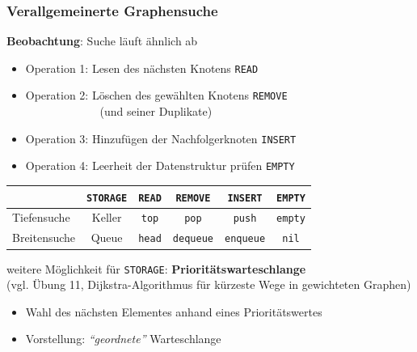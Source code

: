 \documentclass{beamer}
\begin{document}
\begin{frame} \frametitle{Verallgemeinerte Graphensuche}
	\small
	\textbf{Beobachtung}: Suche läuft ähnlich ab
	\begin{itemize}
		\item Operation 1: Lesen des nächsten Knotens \hfill \texttt{READ}
		\item Operation 2: Löschen des gewählten Knotens \hfill \texttt{REMOVE} \\ $\phantom{Operation 2: \enskip}$ \textcolor{cdgray!50}{(und seiner Duplikate)} 
		\item Operation 3: Hinzufügen der Nachfolgerknoten \hfill \texttt{INSERT}
		\item Operation 4: Leerheit der Datenstruktur prüfen \hfill \texttt{EMPTY}
	\end{itemize}

	\pause
	\begin{center}
		\begin{tabular}{l|ccccc}
			& \texttt{STORAGE} & \texttt{READ} & \texttt{REMOVE} & \texttt{INSERT} & \texttt{EMPTY} \\ \hline
			Tiefensuche & Keller & \texttt{top} & \texttt{pop} & \texttt{push} & \texttt{empty} \\
			Breitensuche & Queue & \texttt{head} & \texttt{dequeue} & \texttt{enqueue} & \texttt{nil} \\
		\end{tabular}
	\end{center}
	
	\pause
	weitere Möglichkeit für \texttt{STORAGE}: \textbf{Prioritätswarteschlange} \\
	{\scriptsize (vgl. Übung 11, Dijkstra-Algorithmus für kürzeste Wege in gewichteten Graphen)}
	\vspace{-.5\baselineskip}
	\begin{itemize}
		\item Wahl des nächsten Elementes anhand eines Prioritätswertes
		\item Vorstellung: \textit{\enquote{geordnete}} Warteschlange
	\end{itemize}
\end{frame}
\end{document}
